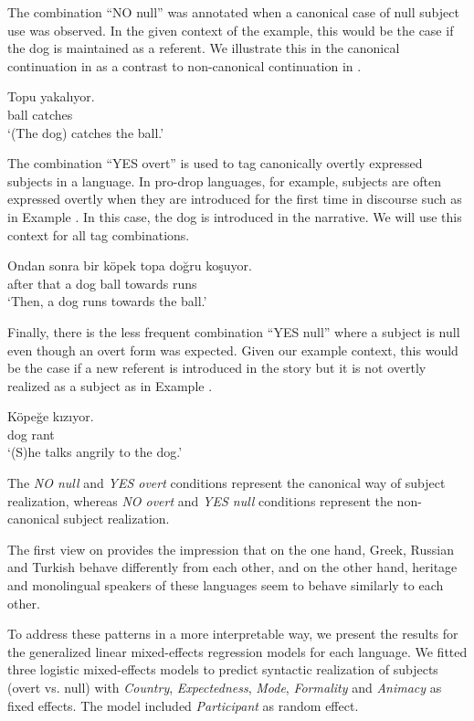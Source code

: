 \documentclass[output=paper,colorlinks,citecolor=brown]{langscibook}
\begin{document}
 The combination ``NO null'' was annotated when a canonical case of null subject use was observed. In the given context of the example, this would be the case if the dog is maintained as a referent. We illustrate this in the canonical continuation in  as a contrast to non-canonical continuation in .   

 \ea \label{ex:oezsoy:NO null}
\gll Topu yakalıyor.\\ 
	ball catches\\
\glt `(The dog) catches the ball.'
\z
{}

The combination ``YES overt'' is used to tag canonically overtly expressed subjects in a language. In pro-drop languages, for example, subjects are often expressed overtly when they are introduced for the first time in discourse such as in Example . In this case, the dog is introduced in the narrative. We will use this context for all tag combinations.

\ea \label{ex:oezsoy:YES overt}
\gll Ondan sonra bir köpek topa doğru koşuyor.\\ 
	after that a dog ball towards runs\\
\glt `Then, a dog runs towards the ball.'
\z
{}

Finally, there is the less frequent combination ``YES null'' where a subject is null even though an overt form was expected. Given our example context, this would be the case if a new referent is introduced in the story but it is not overtly realized as a subject as in Example .
    
\ea \label{ex:oezsoy:YES null}
\gll Köpeğe kızıyor.\\ 
	dog rant\\
\glt `(S)he talks angrily to the dog.'
\z
{}

The \textit{NO null} and \textit{YES overt} conditions represent the canonical way of subject realization, whereas \textit{NO overt} and \textit{YES null} conditions represent the non-canonical subject realization.

The first view on  provides the impression that on the one hand, Greek, Russian and Turkish behave differently from each other, and on the other hand, heritage and monolingual speakers of these languages seem to behave similarly to each other.

To address these patterns in a more interpretable way, we present the results for the generalized linear mixed-effects regression models for each language. 
We fitted three logistic mixed-effects models to predict syntactic realization of subjects (overt vs. null) with \textit{Country}, \textit{Expectedness}, \textit{Mode}, \textit{Formality} and \textit{Animacy} as fixed effects. 
The model included \textit{Participant} as random effect.
\end{document}
